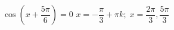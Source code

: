{ $\cos \left( x + \dfrac{5\pi}{6} \right) = 0$}
{ $x = -\dfrac{\pi}{3} + \pi k; \; x = \dfrac{2\pi}{3}, \dfrac{5\pi}{3}$}
